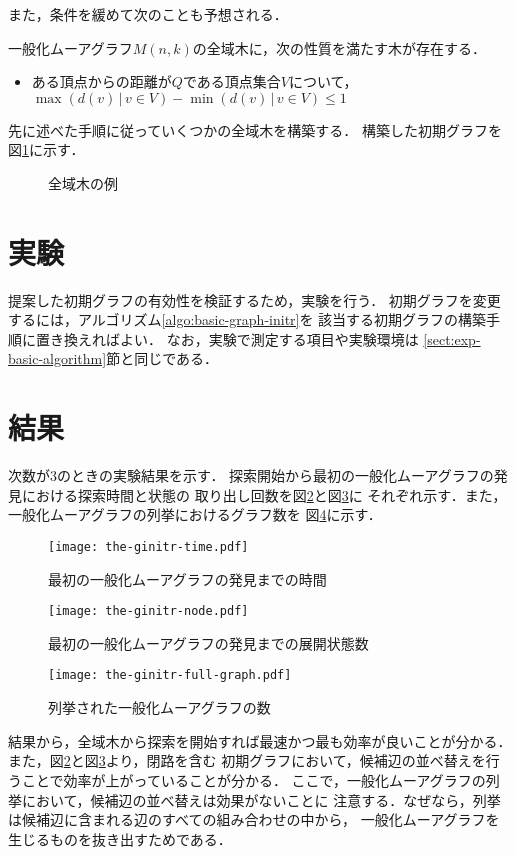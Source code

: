 また，条件を緩めて次のことも予想される．
\begin{conjecture}
  \label{conj:spanning-tree-2}
  一般化ムーアグラフ$M(n,k)$の全域木に，次の性質を満たす木が存在する．
  \begin{itemize}
  \item ある頂点からの距離が$Q$である頂点集合$V$について，
    $\max(d(v)\,|\,v\in V)-\min(d(v)\,|\,v\in V)\leq 1$
  \end{itemize}
\end{conjecture}

\begin{example}
  先に述べた手順に従っていくつかの全域木を構築する．
  構築した初期グラフを図\ref{fig:initial-spanning-tree-example}に示す．
  \begin{figure}
    \centering
    \hfill
    \caption{全域木の例}
    \label{fig:initial-spanning-tree-example}
  \end{figure}
\end{example}

\section{実験}
\label{sect:exp-reduce-by-initial}
提案した初期グラフの有効性を検証するため，実験を行う．
初期グラフを変更するには，アルゴリズム\ref{algo:basic-graph-initr}を
該当する初期グラフの構築手順に置き換えればよい．
なお，実験で測定する項目や実験環境は
\ref{sect:exp-basic-algorithm}節と同じである．

\section{結果}
\label{sect:result-reduce-by-initial}
次数が3のときの実験結果を示す．
探索開始から最初の一般化ムーアグラフの発見における探索時間と状態の
取り出し回数を図\ref{fig:ginitr-time}と図\ref{fig:ginitr-node}に
それぞれ示す．また，一般化ムーアグラフの列挙におけるグラフ数を
図\ref{fig:ginitr-full-graph}に示す．

\begin{figure}
  \centering
  \texttt{[image: the-ginitr-time.pdf]}
  \caption{最初の一般化ムーアグラフの発見までの時間}
  \label{fig:ginitr-time}
\end{figure}
\begin{figure}
  \centering
  \texttt{[image: the-ginitr-node.pdf]}
  \caption{最初の一般化ムーアグラフの発見までの展開状態数}
  \label{fig:ginitr-node}
\end{figure}
\begin{figure}
  \centering
  \texttt{[image: the-ginitr-full-graph.pdf]}
  \caption{列挙された一般化ムーアグラフの数}
  \label{fig:ginitr-full-graph}
\end{figure}

結果から，全域木から探索を開始すれば最速かつ最も効率が良いことが分かる．
また，図\ref{fig:ginitr-time}と図\ref{fig:ginitr-node}より，閉路を含む
初期グラフにおいて，候補辺の並べ替えを行うことで効率が上がっていることが分かる．
ここで，一般化ムーアグラフの列挙において，候補辺の並べ替えは効果がないことに
注意する．なぜなら，列挙は候補辺に含まれる辺のすべての組み合わせの中から，
一般化ムーアグラフを生じるものを抜き出すためである．
